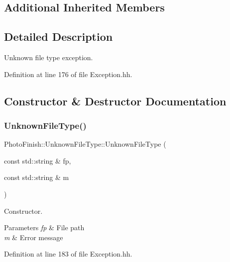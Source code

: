 \subsection*{Additional Inherited Members}


\subsection{Detailed Description}
Unknown file type exception. 

Definition at line 176 of file Exception.\+hh.



\subsection{Constructor \& Destructor Documentation}
\mbox{\label{class_photo_finish_1_1_unknown_file_type_a271518b1c9fbaa399d2edb8e2f3e302f}} 
\subsubsection{\texorpdfstring{Unknown\+File\+Type()}{UnknownFileType()}\hspace{0.1cm}{\footnotesize\ttfamily [1/2]}}
{\footnotesize\ttfamily Photo\+Finish\+::\+Unknown\+File\+Type\+::\+Unknown\+File\+Type (\begin{DoxyParamCaption}\item[{const std\+::string \&}]{fp,  }\item[{const std\+::string \&}]{m }\end{DoxyParamCaption})\hspace{0.3cm}{\ttfamily [inline]}}



Constructor. 


\begin{DoxyParams}{Parameters}
{\em fp} & File path \\
\hline
{\em m} & Error message \\
\hline
\end{DoxyParams}


Definition at line 183 of file Exception.\+hh.

\mbox{\label{class_photo_finish_1_1_unknown_file_type_af84baca5311597b5ed513a732e7499f1}} 
